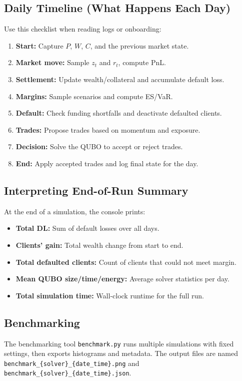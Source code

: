 \documentclass[11pt]{article}
\begin{document}
\subsection{Daily Timeline (What Happens Each Day)}
Use this checklist when reading logs or onboarding:
\begin{enumerate}[leftmargin=*]
  \item \textbf{Start:} Capture $P$, $W$, $C$, and the previous market state.
  \item \textbf{Market move:} Sample $z_t$ and $r_t$, compute PnL.
  \item \textbf{Settlement:} Update wealth/collateral and accumulate default loss.
  \item \textbf{Margins:} Sample scenarios and compute ES/VaR.
  \item \textbf{Default:} Check funding shortfalls and deactivate defaulted clients.
  \item \textbf{Trades:} Propose trades based on momentum and exposure.
  \item \textbf{Decision:} Solve the QUBO to accept or reject trades.
  \item \textbf{End:} Apply accepted trades and log final state for the day.
\end{enumerate}

\subsection{Interpreting End-of-Run Summary}
At the end of a simulation, the console prints:
\begin{itemize}[leftmargin=*]
  \item \textbf{Total DL:} Sum of default losses over all days.
  \item \textbf{Clients' gain:} Total wealth change from start to end.
  \item \textbf{Total defaulted clients:} Count of clients that could not meet margin.
  \item \textbf{Mean QUBO size/time/energy:} Average solver statistics per day.
  \item \textbf{Total simulation time:} Wall-clock runtime for the full run.
\end{itemize}

\subsection{Benchmarking}
The benchmarking tool \texttt{benchmark.py} runs multiple simulations with fixed
settings, then exports histograms and metadata. The output files are named
\texttt{benchmark\_\{solver\}\_\{date\_time\}.png} and
\texttt{benchmark\_\{solver\}\_\{date\_time\}.json}.
\end{document}
